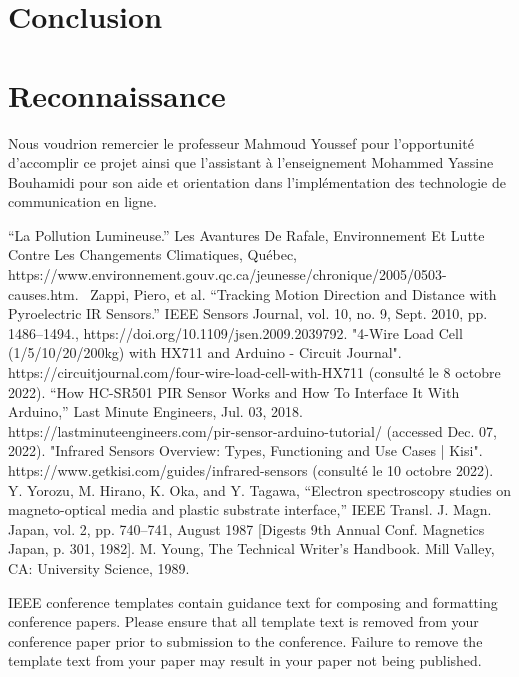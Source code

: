 \documentclass[journal]{IEEEtran}
\begin{document}
\section{Conclusion}

\section*{Reconnaissance}

Nous voudrion remercier le professeur Mahmoud Youssef pour l'opportunité d'accomplir ce projet ainsi
que l'assistant à l'enseignement Mohammed Yassine Bouhamidi pour son aide et orientation dans l'implémentation des technologie de communication en ligne.



\begin{thebibliography}{00}
 “La Pollution Lumineuse.” Les Avantures De Rafale, Environnement Et Lutte Contre Les Changements Climatiques, Québec, https://www.environnement.gouv.qc.ca/jeunesse/chronique/2005/0503-causes.htm. 
 Zappi, Piero, et al. “Tracking Motion Direction and Distance with Pyroelectric IR Sensors.” IEEE Sensors Journal, vol. 10, no. 9, Sept. 2010, pp. 1486–1494., https://doi.org/10.1109/jsen.2009.2039792.
 "4-Wire Load Cell (1/5/10/20/200kg) with HX711 and Arduino - Circuit Journal". https://circuitjournal.com/four-wire-load-cell-with-HX711 (consulté le 8 octobre 2022).
 “How HC-SR501 PIR Sensor Works and How To Interface It With Arduino,” Last Minute Engineers, Jul. 03, 2018. https://lastminuteengineers.com/pir-sensor-arduino-tutorial/ (accessed Dec. 07, 2022).
 "Infrared Sensors Overview: Types, Functioning and Use Cases | Kisi". https://www.getkisi.com/guides/infrared-sensors (consulté le 10 octobre 2022).
 Y. Yorozu, M. Hirano, K. Oka, and Y. Tagawa, ``Electron spectroscopy studies on magneto-optical media and plastic substrate interface,'' IEEE Transl. J. Magn. Japan, vol. 2, pp. 740--741, August 1987 [Digests 9th Annual Conf. Magnetics Japan, p. 301, 1982].
 M. Young, The Technical Writer's Handbook. Mill Valley, CA: University Science, 1989.
\end{thebibliography}
\vspace{12pt}
\color{red}
IEEE conference templates contain guidance text for composing and formatting conference papers. Please ensure that all template text is removed from your conference paper prior to submission to the conference. Failure to remove the template text from your paper may result in your paper not being published.
\end{document}
